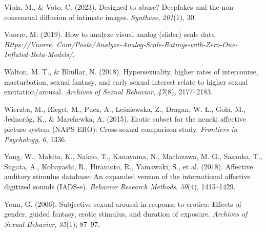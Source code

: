 \documentclass[
  jou,
  floatsintext,
  longtable,
  nolmodern,
  notxfonts,
  notimes,
  colorlinks=true,linkcolor=blue,citecolor=blue,urlcolor=blue]{apa7}
\newlength{\cslhangindent}
\newenvironment{CSLReferences}[2] %
 {\begin{list}{}{%
  \setlength{\itemindent}{0pt}
  \setlength{\leftmargin}{0pt}
  \setlength{\parsep}{0pt}
  \ifodd #1
   \setlength{\leftmargin}{\cslhangindent}
   \setlength{\itemindent}{-1\cslhangindent}
  \fi
  \setlength{\itemsep}{#2\baselineskip}}}
 {\end{list}}
\begin{document}
\begin{CSLReferences}{1}{0}
Viola, M., \& Voto, C. (2023). Designed to abuse? Deepfakes and the
non-consensual diffusion of intimate images. \emph{Synthese},
\emph{201}(1), 30.

Vuorre, M. (2019). How to analyze visual analog (slider) scale data.
\emph{Https://Vuorre.
Com/Posts/Analyze-Analog-Scale-Ratings-with-Zero-One-Inflated-Beta-Models/}.

Walton, M. T., \& Bhullar, N. (2018). Hypersexuality, higher rates of
intercourse, masturbation, sexual fantasy, and early sexual interest
relate to higher sexual excitation/arousal. \emph{Archives of Sexual
Behavior}, \emph{47}(8), 2177--2183.

Wierzba, M., Riegel, M., Pucz, A., Leśniewska, Z., Dragan, W. Ł., Gola,
M., Jednoróg, K., \& Marchewka, A. (2015). Erotic subset for the nencki
affective picture system (NAPS ERO): Cross-sexual comparison study.
\emph{Frontiers in Psychology}, \emph{6}, 1336.

Yang, W., Makita, K., Nakao, T., Kanayama, N., Machizawa, M. G.,
Sasaoka, T., Sugata, A., Kobayashi, R., Hiramoto, R., Yamawaki, S., et
al. (2018). Affective auditory stimulus database: An expanded version of
the international affective digitized sounds (IADS-e). \emph{Behavior
Research Methods}, \emph{50}(4), 1415--1429.

Youn, G. (2006). Subjective sexual arousal in response to erotica:
Effects of gender, guided fantasy, erotic stimulus, and duration of
exposure. \emph{Archives of Sexual Behavior}, \emph{35}(1), 87--97.

\end{CSLReferences}
\end{document}
